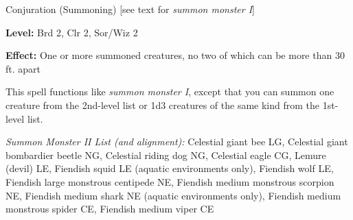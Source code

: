 
Conjuration (Summoning) [see text for \textit{summon monster I}]

\textbf{Level:} Brd 2, Clr 2, Sor/Wiz 2

\textbf{Effect:} One or more summoned creatures, no two of which can be more than 
30 ft. apart

This spell functions like \textit{summon monster I}, except that you can summon 
one creature from the 2nd-level list or 1d3 creatures of the same kind from the 
1st-level list.

\textit{Summon Monster II List (and alignment):} Celestial giant bee LG, Celestial giant bombardier beetle NG, Celestial riding dog NG, Celestial eagle CG, Lemure (devil) LE, Fiendish squid LE (aquatic environments only), Fiendish wolf LE, Fiendish large monstrous centipede NE, Fiendish medium monstrous scorpion NE, Fiendish medium shark NE (aquatic environments only), Fiendish medium monstrous spider CE, Fiendish medium viper CE